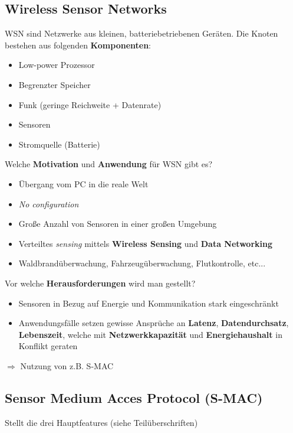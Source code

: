 \documentclass{article} %
\begin{document}
\subsection{Wireless Sensor Networks}
WSN sind Netzwerke aus kleinen, batteriebetriebenen Geräten.
Die Knoten bestehen aus folgenden \textbf{Komponenten}:
\begin{multicols}{2}
	\begin{itemize}
		\item Low-power Prozessor
		\item Begrenzter Speicher
		\item Funk (geringe Reichweite + Datenrate)
		\item Sensoren
		\item Stromquelle (Batterie)
	\end{itemize}
\end{multicols}
Welche \textbf{Motivation} und \textbf{Anwendung} für WSN gibt es?
\begin{multicols}{2}
	\begin{itemize}
		\item Übergang vom PC in die reale Welt
		\item \emph{No configuration}
		\item Große Anzahl von Sensoren in einer großen Umgebung
		\item Verteiltes \emph{sensing} mittels \textbf{Wireless Sensing} und \textbf{Data Networking}
		\item Waldbrandüberwachung, Fahrzeugüberwachung, Flutkontrolle, etc...
	\end{itemize}
\end{multicols}
Vor welche \textbf{Herausforderungen} wird man gestellt?
\begin{itemize}
		\item Sensoren in Bezug auf Energie und Kommunikation stark eingeschränkt
		\item Anwendungsfälle setzen gewisse Ansprüche an \textbf{Latenz}, \textbf{Datendurchsatz}, \textbf{Lebenszeit}, welche mit \textbf{Netzwerkkapazität} und \textbf{Energiehaushalt} in Konflikt geraten
\end{itemize}
$\Rightarrow$ Nutzung von z.B. S-MAC
\subsection{Sensor Medium Acces Protocol (S-MAC)}
Stellt die drei Hauptfeatures (siehe Teilüberschriften)
\end{document}
